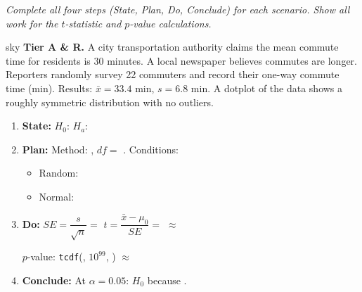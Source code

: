 \documentclass[10pt]{article}
\begin{document}
\namepartnerperiod

\vspace{0.15in}

\textit{Complete all four steps (State, Plan, Do, Conclude) for each scenario. Show all work
for the $t$-statistic and $p$-value calculations.}

\begin{scenariobox}{sky}
\textbf{Tier A \& R.} \quad
A city transportation authority claims the mean commute time for residents is 30 minutes.
A local newspaper believes commutes are longer. Reporters randomly survey 22 commuters and
record their one-way commute time (min). Results: $\bar x = 33.4$ min, $s = 6.8$ min.
A dotplot of the data shows a roughly symmetric distribution with no outliers.

\begin{enumerate}[label=\alph*.]
  \item \textbf{State:} $H_0$:  \quad $H_a$: 
  \item \textbf{Plan:} Method: , $df = $ . Conditions:
        \begin{itemize}
          \item Random: 
          \item Normal: 
        \end{itemize}
  \item \textbf{Do:} $SE = \dfrac{s}{\sqrt{n}} = $  \quad
        $t = \dfrac{\bar x - \mu_0}{SE} = $  $\approx$ 

        $p$-value: \texttt{tcdf}(, $10^{99}$, ) $\approx$ 

  \item \textbf{Conclude:} At $\alpha = 0.05$:  $H_0$ because .
\end{enumerate}
\end{scenariobox}
\end{document}
